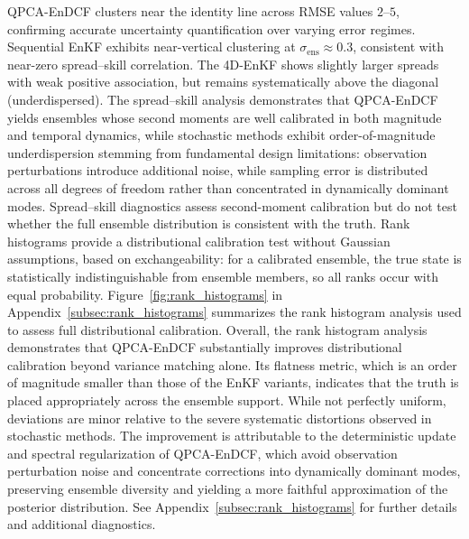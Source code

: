 \documentclass[11pt,a4paper]{article}
\begin{document}
QPCA-EnDCF clusters near the identity line across RMSE values $2$--$5$, confirming accurate uncertainty quantification over varying error regimes. Sequential EnKF exhibits near-vertical clustering at $\sigma_{\mathrm{ens}}\approx0.3$, consistent with near-zero spread--skill correlation. The 4D-EnKF shows slightly larger spreads with weak positive association, but remains systematically above the diagonal (underdispersed).
The spread--skill analysis demonstrates that QPCA-EnDCF yields ensembles whose second moments are well calibrated in both magnitude and temporal dynamics, while stochastic methods exhibit order-of-magnitude underdispersion stemming from fundamental design limitations: observation perturbations introduce additional noise, while sampling error is distributed across all degrees of freedom rather than concentrated in dynamically dominant modes.
Spread--skill diagnostics assess second-moment calibration but do not test whether the full ensemble distribution is consistent with the truth. Rank histograms provide a distributional calibration test without Gaussian assumptions, based on exchangeability: for a calibrated ensemble, the true state is statistically indistinguishable from ensemble members, so all ranks occur with equal probability.
Figure~\ref{fig:rank_histograms} in Appendix~\ref{subsec:rank_histograms} summarizes the rank histogram analysis used to assess full distributional calibration. Overall, the rank histogram analysis demonstrates that QPCA-EnDCF substantially improves distributional calibration beyond variance matching alone. Its flatness metric, which is an order of magnitude smaller than those of the EnKF variants, indicates that the truth is placed appropriately across the ensemble support.
 While not perfectly uniform, deviations are minor relative to the severe systematic distortions observed in stochastic methods. The improvement is attributable to the deterministic update and spectral regularization of QPCA-EnDCF, which avoid observation perturbation noise and concentrate corrections into dynamically dominant modes, preserving ensemble diversity and yielding a more faithful approximation of the posterior distribution. See Appendix~\ref{subsec:rank_histograms} for further details and additional diagnostics.


\end{document}
